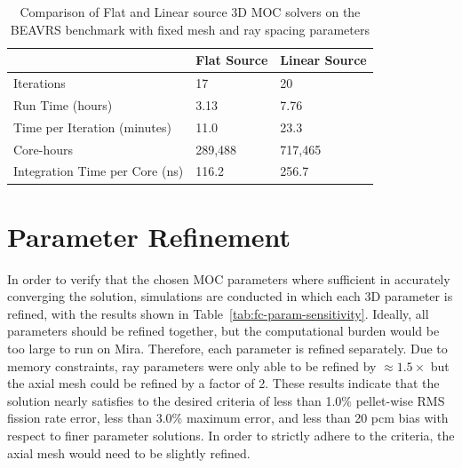\begin{table}[ht]
	\centering
	\caption{Comparison of Flat and Linear source 3D \ac{MOC} solvers on the BEAVRS benchmark with fixed mesh and ray spacing parameters}
	\medskip
	\begin{tabular}{l|l|l}
		\hline
		 & Flat Source & Linear Source \\
		\hline
		Iterations & 17 & 20 \\
		Run Time (hours) & 3.13 & 7.76 \\
		Time per Iteration (minutes) & 11.0 & 23.3 \\
		Core-hours & 289,488 & 717,465 \\
		Integration Time per Core (ns) & 116.2 & 256.7 \\
		\hline
	\end{tabular}
	\label{tab:fc-comp-flat-linear}
\end{table}

\section{Parameter Refinement}
\label{sec:fc-parameter-refinement}

In order to verify that the chosen \ac{MOC} parameters where sufficient in accurately converging the solution, simulations are conducted in which each 3D parameter is refined, with the results shown in Table~\ref{tab:fc-param-sensitivity}. Ideally, all parameters should be refined together, but the computational burden would be too large to run on Mira. Therefore, each parameter is refined separately. Due to memory constraints, ray parameters were only able to be refined by $\approx 1.5 \times$ but the axial mesh could be refined by a factor of 2. These results indicate that the solution nearly satisfies to the desired criteria of less than 1.0\% pellet-wise RMS fission rate error, less than 3.0\% maximum error, and less than 20 pcm bias with respect to finer parameter solutions. In order to strictly adhere to the criteria, the axial mesh would need to be slightly refined.


